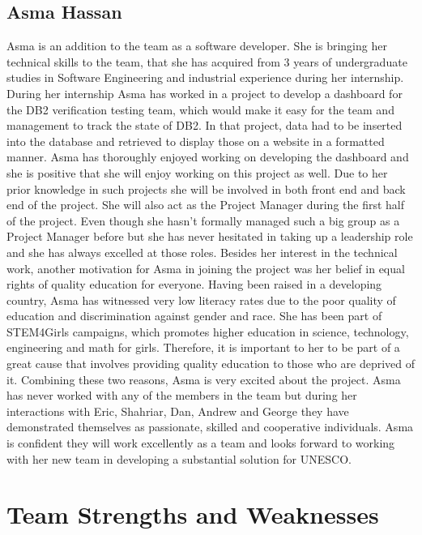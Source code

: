 \documentclass[11pt]{article}
\begin{document}
\subsection*{\textbf{Asma Hassan}}
Asma is an addition to the team as a software developer. She is bringing her technical skills to the team, that she has acquired from 3 years of undergraduate studies in Software Engineering and industrial experience during her internship. During her internship Asma has worked in a project to develop a dashboard for the DB2 verification testing team, which would make it easy for the team and management to track the state of DB2. In that project, data had to be inserted into the database and retrieved to display those on a website in a formatted manner. Asma has thoroughly enjoyed working on developing the dashboard and she is positive that she will enjoy working on this project as well. Due to her prior knowledge in such projects she will be involved in both front end and back end of the project. She will also act as the Project Manager during the first half of the project. Even though she hasn't formally managed such a big group as a Project Manager before but she has never hesitated in taking up a leadership role and she has always excelled at those roles. Besides her interest in the technical work, another motivation for Asma in joining the project was her belief in equal rights of quality education for everyone. Having been raised in a developing country, Asma has witnessed very low literacy rates due to the poor quality of education and discrimination against gender and race. She has been part of STEM4Girls campaigns, which promotes higher education in science, technology, engineering and math for girls. Therefore, it is important to her to be part of a great cause that involves providing quality education to those who are deprived of it. Combining these two reasons, Asma is very excited about the project. Asma has never worked with any of the members in the team but during her interactions with Eric, Shahriar, Dan, Andrew and George they have demonstrated themselves as passionate, skilled and cooperative individuals. Asma is confident they will work excellently as a team and looks forward to working with her new team in developing a substantial solution for UNESCO. \\

\newpage

\section*{Team Strengths and Weaknesses}
\end{document}
